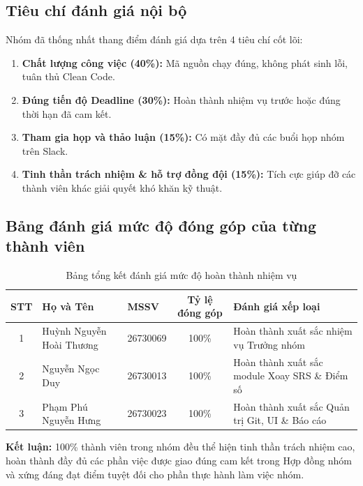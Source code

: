 \documentclass[12pt,a4paper]{article}
\begin{document}
\subsection{Tiêu chí đánh giá nội bộ}
Nhóm đã thống nhất thang điểm đánh giá dựa trên 4 tiêu chí cốt lõi:
\begin{enumerate}
    \item \textbf{Chất lượng công việc (40\%):} Mã nguồn chạy đúng, không phát sinh lỗi, tuân thủ Clean Code.
    \item \textbf{Đúng tiến độ Deadline (30\%):} Hoàn thành nhiệm vụ trước hoặc đúng thời hạn đã cam kết.
    \item \textbf{Tham gia họp và thảo luận (15\%):} Có mặt đầy đủ các buổi họp nhóm trên Slack.
    \item \textbf{Tinh thần trách nhiệm \& hỗ trợ đồng đội (15\%):} Tích cực giúp đỡ các thành viên khác giải quyết khó khăn kỹ thuật.
\end{enumerate}

\subsection{Bảng đánh giá mức độ đóng góp của từng thành viên}
\begin{table}[h!]
\centering
\begin{tabularx}{\textwidth}{cllcX}
\toprule
\textbf{STT} & \textbf{Họ và Tên} & \textbf{MSSV} & \textbf{Tỷ lệ đóng góp} & \textbf{Đánh giá xếp loại} \\
\midrule
1 & Huỳnh Nguyễn Hoài Thương & 26730069 & 100\% & Hoàn thành xuất sắc nhiệm vụ Trưởng nhóm \\
2 & Nguyễn Ngọc Duy & 26730013 & 100\% & Hoàn thành xuất sắc module Xoay SRS \& Điểm số \\
3 & Phạm Phú Nguyễn Hưng & 26730023 & 100\% & Hoàn thành xuất sắc Quản trị Git, UI \& Báo cáo \\
\bottomrule
\end{tabularx}
\caption{Bảng tổng kết đánh giá mức độ hoàn thành nhiệm vụ}
\end{table}

\begin{tcolorbox}[colback=blue!5!white,colframe=blue!60!black]
    \textbf{Kết luận:} 100\% thành viên trong nhóm đều thể hiện tinh thần trách nhiệm cao, hoàn thành đầy đủ các phần việc được giao đúng cam kết trong Hợp đồng nhóm và xứng đáng đạt điểm tuyệt đối cho phần thực hành làm việc nhóm.
\end{tcolorbox}
\end{document}
